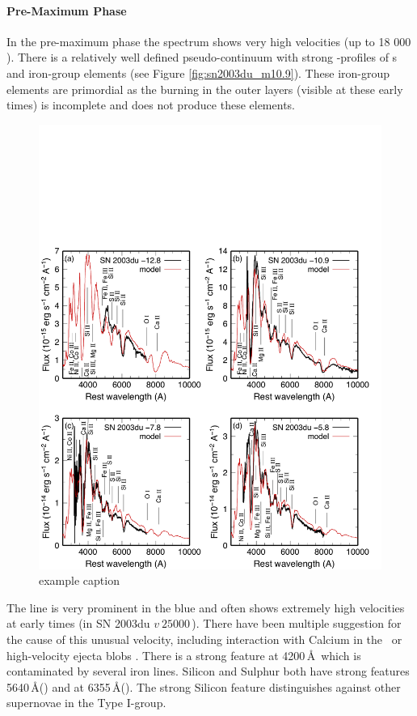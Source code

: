 \paragraph{Pre-Maximum Phase}
In the pre-maximum phase the spectrum shows very high velocities (up to 18 000 \kms). There is a relatively well defined pseudo-continuum with strong \pcygni-profiles of \ime s and iron-group elements (see Figure \ref{fig:sn2003du_m10.9}). These iron-group elements are primordial as the burning in the outer layers (visible at these early times) is incomplete and does not produce these elements. 
\begin{figure}[htbp] %
   \centering
   \includegraphics[width=\textwidth]{chapter_intro/plots/sn2003du_t-10.pdf} 
   \caption{example caption}
   \label{fig:sn2003du_t-10}
\end{figure}

The  line is very prominent in the blue and often shows extremely high velocities at early times (in SN 2003du $v ~ 25000$\,\kms). There have been multiple suggestion for the cause of this unusual velocity, including interaction with Calcium in the \ism\ or high-velocity ejecta blobs \citep{1999ApJ...525..881H,2004ApJ...607..391G,2004ApJ...601.1019T,2005ApJ...623L..37M,2006ApJ...636..400Q,2006ApJ...645..470T,2007A&A...471..527G}.
There is a strong  feature at 4200\,\AA\ which is contaminated by several iron lines. Silicon and Sulphur both have strong features 5640\,\AA () and at 6355\,\AA (). The strong Silicon feature distinguishes \sneia against other supernovae in the Type I-group. 

